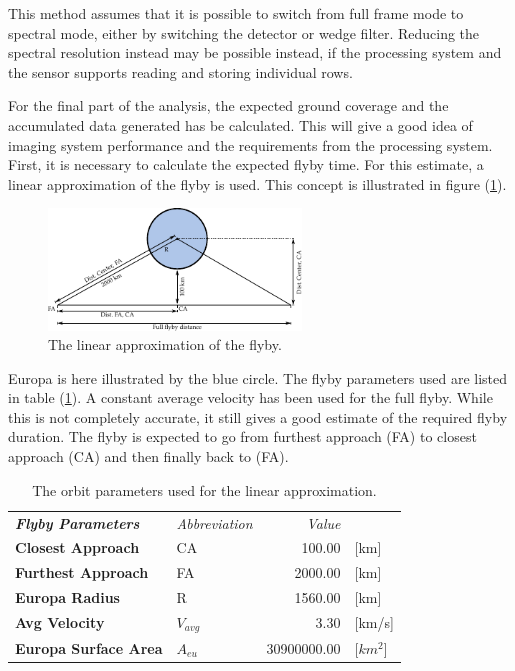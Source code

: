 This method assumes that it is possible to switch from full frame mode to spectral mode, either by switching the detector or wedge filter. Reducing the spectral resolution instead may be possible instead, if the processing system and the sensor supports reading and storing individual rows.

For the final part of the analysis, the expected ground coverage and the accumulated data generated has be calculated. This will give a good idea of imaging system performance and the requirements from the processing system. First, it is necessary to calculate the expected flyby time. For this estimate, a linear approximation of the flyby is used. This concept is illustrated in figure (\ref{fig:linear_flyby}). 
\begin{figure}[htb!]
\centering
\includegraphics[width=0.6\textwidth]{figures/Orbiter/linear_flyby.pdf}
\caption{The linear approximation of the flyby.}
\label{fig:linear_flyby}
\end{figure}
Europa is here illustrated by the blue circle. The flyby parameters used are listed in table (\ref{tab:orbit_parameters_linear}). A constant average velocity has been used for the full flyby. While this is not completely accurate, it still gives a good estimate of the required flyby duration.%
The flyby is expected to go from furthest approach (FA) to closest approach (CA) and then finally back to (FA).
\begin{table}[htb!]
  \centering
    \begin{tabular}{l|l|r|l}
\textit{\textbf{Flyby Parameters}} & \textit{Abbreviation} & \multicolumn{1}{r}{\textit{Value}} &  \bigstrut[b]\\
\cline{1-3}\textbf{Closest Approach} & CA    & 100.00 & [km] \bigstrut[t]\\
\textbf{Furthest Approach} & FA    & 2000.00 & [km] \\
\textbf{Europa Radius} & R     & 1560.00 & [km] \\
\textbf{Avg Velocity} & $V_{avg}$ & 3.30  & [km/s] \\
\textbf{Europa Surface Area} & $A_{eu}$ & 30900000.00 & [$km^2$] \\
\end{tabular}%
    \caption{The orbit parameters used for the linear approximation.}
  \label{tab:orbit_parameters_linear}%
\end{table}%

